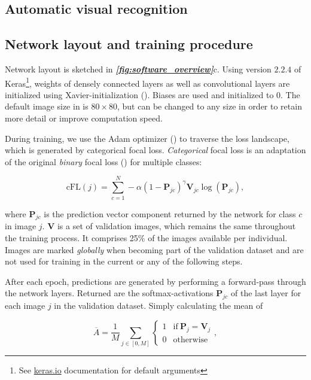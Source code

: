 \documentclass[9pt,lineno]{elife}
\newcommand{\figref}[1]{\textit{\textbf{\ref{#1}}}}
\newcommand{\TRex}{\protect\path{TRex}}
\begin{document}
\begin{appendixbox}
\section{Automatic visual recognition} \label{sec:appendix_recognition}

\subsection{Network layout and training procedure}

Network layout is sketched in \figref{fig:software_overview}c. Using version $2.2.4$ of Keras\footnote{See \href{https://keras.io/api/layers/initializers/\#glorotuniform-class}{keras.io} documentation for default arguments}, weights of densely connected layers as well as convolutional layers are initialized using Xavier-initialization (\cite{pmlr-v9-glorot10a}). Biases are used and initialized to 0. The default image size in \TRex{} is $80\times 80$, but can be changed to any size in order to retain more detail or improve computation speed.

During training, we use the Adam optimizer (\cite{kingma2014adam}) to traverse the loss landscape, which is generated by categorical focal loss. \textit{Categorical} focal loss is an adaptation of the original \textit{binary} focal loss (\cite{lin2017focal}) for multiple classes:

$$ \mathrm{cFL}(j) = \sum_{c=1}^N  - \alpha \left(1 - \mathbf{P}_{jc}\right)^\gamma \mathbf{V}_{jc} \log\left(\mathbf{P}_{jc}\right), $$

where $\mathbf{P}_{jc}$ is the prediction vector component returned by the network for class $c$ in image $j$. $\mathbf{V}$ is a set of validation images, which remains the same throughout the training process. It comprises 25\% of the images available per individual. Images are marked \textit{globally} when becoming part of the validation dataset and are not used for training in the current or any of the following steps. 

After each epoch, predictions are generated by performing a forward-pass through the network layers. Returned are the softmax-activations $\mathbf{P}_{jc}$ of the last layer for each image $j$ in the validation dataset. Simply calculating the mean of 

$$ \overline{A} = \frac1M\sum_{j\in[0,M]} \begin{cases} 1 & \mathrm{if}\ \mathbf{P}_j = \mathbf{V}_j \\ 0 & \mathrm{otherwise} \end{cases}, $$


\end{appendixbox}
\end{document}
